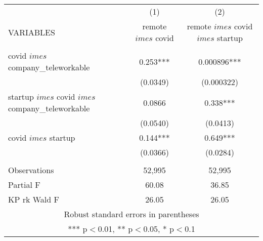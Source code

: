 \begin{tabular}{lcc} \hline
 & (1) & (2) \\
VARIABLES & remote $	imes$ covid & remote $	imes$ covid $	imes$ startup \\ \hline
 &  &  \\
covid $	imes$ company\_teleworkable & 0.253*** & 0.000896*** \\
 & (0.0349) & (0.000322) \\
startup $	imes$ covid $	imes$ company\_teleworkable & 0.0866 & 0.338*** \\
 & (0.0540) & (0.0413) \\
covid $	imes$ startup & 0.144*** & 0.649*** \\
 & (0.0366) & (0.0284) \\
 &  &  \\
Observations & 52,995 & 52,995 \\
Partial F & 60.08 & 36.85 \\
 KP rk Wald F & 26.05 & 26.05 \\ \hline
\multicolumn{3}{c}{ Robust standard errors in parentheses} \\
\multicolumn{3}{c}{ *** p$<$0.01, ** p$<$0.05, * p$<$0.1} \\
\end{tabular}
